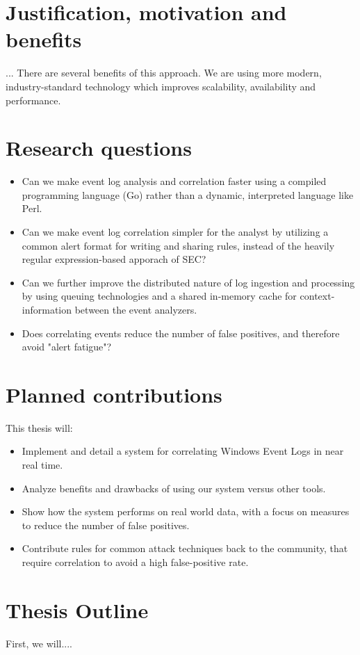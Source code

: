 \section{Justification, motivation and benefits}
\label{sec:justificationmotivationandbenefits}
...
There are several benefits of this approach. We are using more modern, industry-standard technology which improves scalability, availability and performance.

\section{Research questions}
\label{sec:researchquestions}

\begin{itemize}
    \item Can we make event log analysis and correlation faster using a compiled programming language (Go) rather than a dynamic, interpreted language like Perl.
    \item Can we make event log correlation simpler for the analyst by utilizing a common alert format for writing and sharing rules, instead of the heavily regular expression-based apporach of SEC?
    \item Can we further improve the distributed nature of log ingestion and processing by using queuing technologies and a shared in-memory cache for context-information between the event analyzers.
    \item Does correlating events reduce the number of false positives, and therefore avoid "alert fatigue"?
\end{itemize}

\section{Planned contributions}
\label{sec:plannedcontributions}

This thesis will:

\begin{itemize}
    \item Implement and detail a system for correlating Windows Event Logs in near real time.
    \item Analyze benefits and drawbacks of using our system versus other tools.
    \item Show how the system performs on real world data, with a focus on measures to reduce the number of false positives.
    \item Contribute rules for common attack techniques back to the community, that require correlation to avoid a high false-positive rate.
\end{itemize}


\section{Thesis Outline}
\label{sec:thesisoutline}

First, we will....